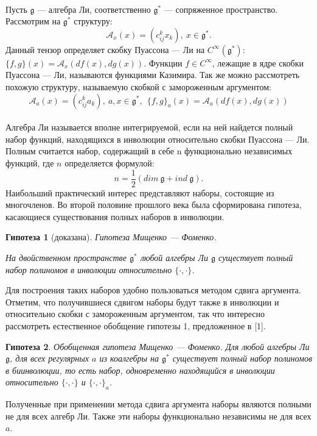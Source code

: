 \usepackage{amsmath,amsthm,amsfonts,amssymb,amscd}
\usepackage{longtable}
\usepackage[utf8]{inputenc}
\usepackage[russian]{babel}

\usepackage{colortbl}

\newtheorem{conjecture}{Гипотеза}
\newtheorem{theorem}{Теорема}


\
\vzmscaption

%


Пусть $\mathfrak{g}$ --- алгебра Ли, соответственно ${\mathfrak{g}}^*$ --- сопряженное пространство. Рассмотрим на ${\mathfrak{g}^*}$ структуру:
$$
\mathcal{A}_x(x)=(c_{ij}^{k}x_k), \ x\in \mathfrak{g}^*.
$$
Данный тензор определяет скобку Пуассона --- Ли на $C^{\infty}(\mathfrak{g}^*)$: $
\{f,g\}(x)=\mathcal{A}_{x}(df(x),dg(x))
$. Функции $f\in C^{\infty}$, лежащие в ядре скобки Пуассона --- Ли, называются функциями Казимира.
Так же можно рассмотреть похожую структуру, называемую скобкой с замороженным аргументом:
$$
\mathcal{A}_a(x)=(c_{ij}^{k}a_k), \ a, x\in \mathfrak{g}^*, \ \ \{f,g\}_a(x)=\mathcal{A}_{a}(df(x),dg(x))
$$
\\
Алгебра Ли называется вполне интегрируемой, если на ней найдется полный набор функций, находящихся в инволюции относительно скобки Пуассона ---  Ли. Полным считается набор, содержащий в себе n функционально независимых функций, где $n$ определяется формулой:
$$
n = \frac1 2 (dim\ \mathfrak{g}+ind\ \mathfrak{g}).
$$
Наибольший практический интерес представляют наборы, состоящие из многочленов. Во второй половине прошлого века была сформирована гипотеза, касающиеся существования полных наборов в инволюции.
\begin{conjecture}[доказана]{Гипотеза Мищенко --- Фоменко.} 
 
На двойственном пространстве $\mathfrak{g}^*$ любой алгебры Ли $\mathfrak{g}$ существует полный набор полиномов в инволюции относительно $\{\cdot,\cdot\}$.
\end{conjecture}
Для построения таких наборов удобно пользоваться методом сдвига аргумента.
    Отметим, что получившиеся сдвигом наборы будут также в инволюции и относительно скобки с замороженным аргументом, так что интересно рассмотреть естественное обобщение гипотезы 1, предложенное в [1].
    \begin{conjecture}
    {Обобщенная гипотеза Мищенко --- Фоменко.} Для любой алгебры Ли $\mathfrak{g}$, для всех регулярных $a$ из коалгебры на $\mathfrak{g}^*$  существует полный набор полиномов в биинволюции, то есть набор, одновременно находящийся в инволюции относительно $\{\cdot,\cdot\}$  и $\{\cdot,\cdot\}_a$.
    \end{conjecture}
   Полученные при применении метода сдвига аргумента наборы являются полными не для всех алгебр Ли. Также эти наборы функционально независимы не для всех $a$.
     
